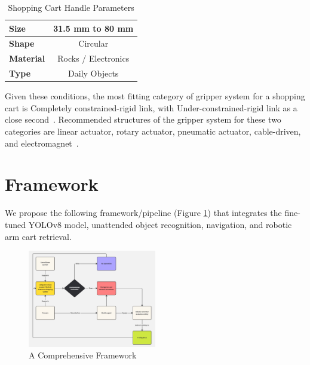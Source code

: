 \documentclass[10pt,twocolumn,letterpaper]{article}
\begin{document}
\begin{table}[h]
\centering
\begin{tabular}{lc}
\hline
\textbf{Size} & 31.5 mm to 80 mm\\
\hline
\textbf{Shape} & Circular\\
\hline
\textbf{Material} & Rocks / Electronics \\
\hline
\textbf{Type} & Daily Objects \\
\hline
\end{tabular}
\caption{Shopping Cart Handle Parameters}
\label{Shopping Cart Handle Parameters}
\end{table}

Given these conditions, the most fitting category of gripper system for a shopping cart is Completely constrained-rigid link, with Under-constrained-rigid link as a close second~\cite{robotic-arm}. Recommended structures of the gripper system for these two categories are linear actuator, rotary actuator, pneumatic actuator, cable-driven, and electromagnet~\cite{robotic-arm}.

\section{Framework}
We propose the following framework/pipeline (Figure \ref{framework}) that integrates the fine-tuned YOLOv8 model, unattended object recognition, navigation, and robotic arm cart retrieval.

\begin{figure}[ht]
    \centering
    \includegraphics[width=0.5\textwidth]{images/Pipeline.jpg}
    \caption{A Comprehensive Framework}
    \label{framework}
\end{figure}
\end{document}
